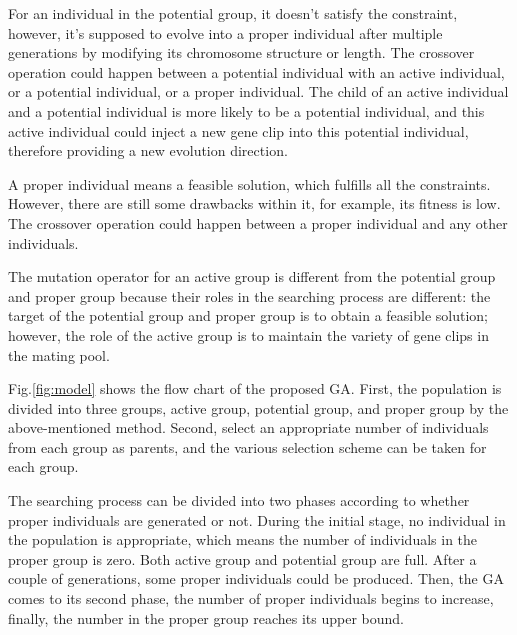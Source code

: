 For an individual in the potential group, it doesn't satisfy the constraint,
however, it's supposed to evolve into a proper individual after multiple
generations by modifying its chromosome structure or length. The crossover
operation could happen between a potential individual with an active
individual, or a potential individual, or a proper individual. The child of an
active individual and a potential individual is more likely to be a potential individual,
and this active individual could inject a new gene clip into this potential
individual, therefore providing a new evolution direction. 


A proper individual means a feasible solution, which fulfills all the constraints. 
However, there are still some drawbacks within it, for example, its fitness is low.
The crossover operation could happen between a proper individual and any other individuals.


The mutation operator for an active group is different from the potential group
and proper group because their roles in the searching process are different:
the target of the potential group and proper group is to obtain a feasible
solution; however, the role of the active group is to maintain the variety of gene
clips in the mating pool. 

Fig.\ref{fig:model} shows the flow chart of the proposed GA. First, the
population is divided into three groups, active group, potential group, and
proper group by the above-mentioned method. Second, select an appropriate number of
individuals from each group as parents, and the various selection scheme can be
taken for each group. 


The searching process can be divided into two phases according to whether
proper individuals are generated or not. During the initial stage, no individual in
the population is appropriate, which means the number of individuals in the
proper group is zero. Both active group and potential group are full. After a
couple of generations, some proper individuals could be produced. Then, the GA
comes to its second phase, the number of proper individuals begins to increase,
finally, the number in the proper group reaches its upper bound. 

